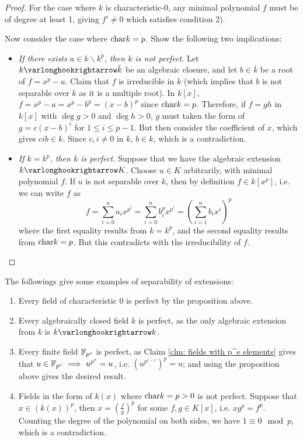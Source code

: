 \documentclass{article}
\begin{document}
\begin{proof}
    For the case where $k$ is characteristic-0, any minimal polynomial $f$ must be of degree at least 1, giving $f' \neq 0$ which satisfies condition 2).

    Now consider the case where $\mathrm{char}{k} = p$. Show the following two implications:
    \begin{itemize}
        \item \emph{If there exists $a \in k \smallsetminus k^p$, then $k$ is not perfect.} Let $k \ext \bar{k}$ be an algebraic closure, and let $b \in \bar{k}$ be a root of $f = x^p - a$. Claim that $f$ is irreducible in $k$ (which implies that $b$ is not separable over $k$ as it is a multiple root). In $k[x]$, $f = x^p - a = x^p - b^p = (x - b)^p$ since $\mathrm{char}{k} = p$. Therefore, if $f = gh$ in $k[x]$ with $\deg g > 0$ and $\deg h > 0$, $g$ must taken the form of $g = c(x - b)^i$ for $1 \leq i \leq p - 1$. But then consider the coefficient of $x$, which gives $cib \in k$. Since $c, i \neq 0$ in $k$, $b \in k$, which is a contradiction.
        \item \emph{If $k = k^p$, then $k$ is perfect.} Suppose that we have the algebraic extension $k \ext K$. Choose $u \in K$ arbitrarily, with minimal polynomial $f$. If $u$ is not separable over $k$, then by definition $f \in k[x^p]$, i.e. we can write $f$ as
        \[
            f = \sum_{i = 0}^n a_i x^{p^i} = \sum_{i = 0}^n b_i^p x^{p^i} = \left( \sum_{i = 1}^n b_i x^i \right)^p
        \]
        where the first equality results from $k = k^p$, and the second equality results from $\mathrm{char}{k} = p$. But this contradicts with the irreducibility of $f$.
    \end{itemize}
\end{proof}

\begin{example}
    The followings give some examples of separability of extensions:
    \begin{enumerate}
        \item Every field of characteristic 0 is perfect by the proposition above.
        \item Every algebraically closed field $k$ is perfect, as the only algebraic extension from $k$ is $k \ext k$.
        \item Every finite field $\mathbb{F}_{p^e}$ is perfect, as Claim \ref{clm: fields with p^e elements} gives that $u \in \mathbb{F}_{p^e} \ \Longrightarrow\  u^{p^e} = u$, i.e. $\left(u^{p^{e-1}}\right)^p = u$; and using the proposition above gives the desired result.
        \item Fields in the form of $k(x)$ where $\mathrm{char}{k} = p > 0$ is not perfect. Suppose that $x \in \left( k(x) \right)^p$, then $x = \left( \frac{f}{g} \right)^p$ for some $f, g \in K[x]$, i.e. $x g^p = f^p$. Counting the degree of the polynomial on both sides, we have $1 \equiv 0 \mod{p}$, which is a contradiction.
    \end{enumerate}
\end{example}
\end{document}
